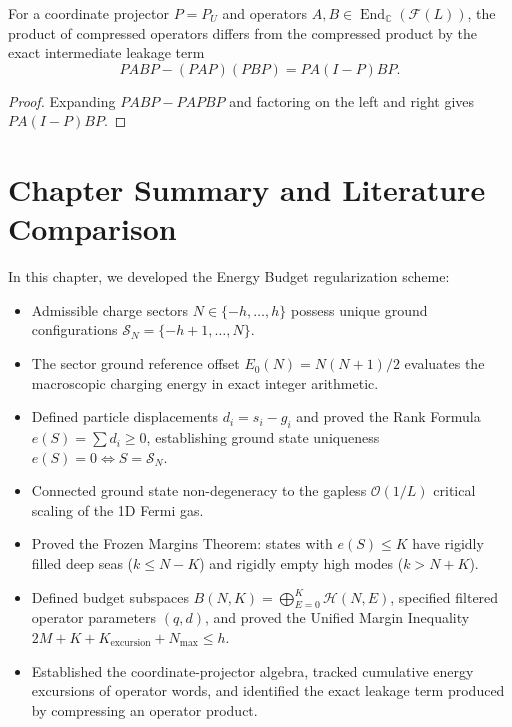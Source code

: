 \begin{proposition}
\label{prop:compression_remainder}
For a coordinate projector $P=P_U$ and operators $A,B\in\operatorname{End}_{\mathbb C}(\mathcal F(L))$, the product of compressed operators differs from the compressed product by the exact intermediate leakage term
\begin{equation}
PABP-(PAP)(PBP)=PA(I-P)BP.
\end{equation}
\end{proposition}

\begin{proof}
Expanding $PABP-PAPBP$ and factoring on the left and right gives $PA(I-P)BP$.
\end{proof}

\section{Chapter Summary and Literature Comparison}

In this chapter, we developed the Energy Budget regularization scheme:
\begin{itemize}
    \item Admissible charge sectors $N \in \{-h, \dots, h\}$ possess unique ground configurations $\mathcal{S}_N = \{-h+1, \dots, N\}$.
    \item The sector ground reference offset $E_0(N) = N(N+1)/2$ evaluates the macroscopic charging energy in exact integer arithmetic.
    \item Defined particle displacements $d_i = s_i - g_i$ and proved the Rank Formula $e(S) = \sum d_i \ge 0$, establishing ground state uniqueness $e(S) = 0 \iff S = \mathcal{S}_N$.
    \item Connected ground state non-degeneracy to the gapless $\mathcal{O}(1/L)$ critical scaling of the 1D Fermi gas.
    \item Proved the Frozen Margins Theorem: states with $e(S) \le K$ have rigidly filled deep seas ($k \le N - K$) and rigidly empty high modes ($k > N + K$).
    \item Defined budget subspaces $B(N, K) = \bigoplus_{E=0}^K \mathcal{H}(N, E)$, specified filtered operator parameters $(q, d)$, and proved the Unified Margin Inequality $2M + K + K_{\mathrm{excursion}} + N_{\max} \le h$.
    \item Established the coordinate-projector algebra, tracked cumulative energy excursions of operator words, and identified the exact leakage term produced by compressing an operator product.
\end{itemize}

